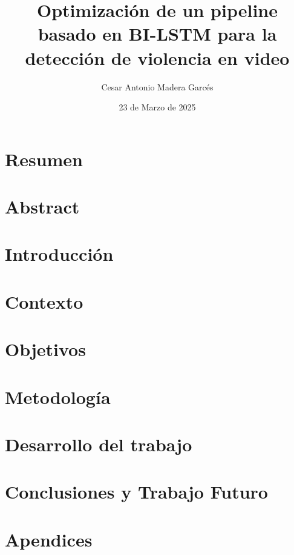 \documentclass[11pt,a4paper,spanish]{book}
\title{Optimización de un pipeline basado en BI-LSTM para la detección de violencia en video}
\author{Cesar Antonio Madera Garcés}
\date{23 de Marzo de 2025}
\numberwithin{equation}{chapter}
\numberwithin{figure}{chapter}
\begin{document}
\renewcommand{\listfigurename}{Índice de Ilustraciones}
\renewcommand{\listtablename}{Índice de Tablas}
\renewcommand{\contentsname}{Índice de Contenidos}
\renewcommand{\figurename}{Figura}
\renewcommand{\tablename}{Tabla} 

\maketitle

\frontmatter
\tableofcontents
\listoffigures
\listoftables

\chapter{Resumen}




\chapter{Abstract}


\mainmatter
\chapter{Introducción}



\chapter{Contexto}


\chapter{Objetivos}


\chapter{Metodología}


\chapter{Desarrollo del trabajo}


\chapter{Conclusiones y Trabajo Futuro}





\appendix
\chapter{Apendices}
\end{document}
